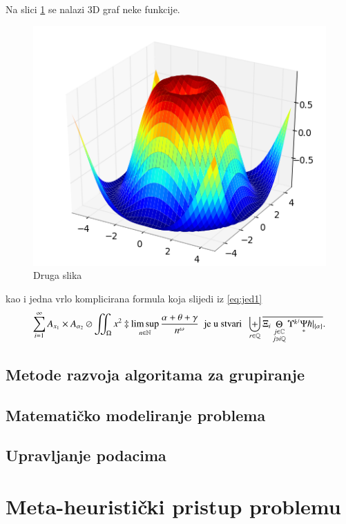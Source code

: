 \documentclass[a4paper,twoside,12pt]{memoir} %
\begin{document}
Na slici \ref{fig:3d} se nalazi 3D graf neke funkcije. 

\begin{figure}[h!t]
\centering \includegraphics{surface3d.png}
\caption{Druga slika}
\label{fig:3d}
\end{figure}

kao i jedna vrlo komplicirana formula koja slijedi iz \eqref{eq:jed1}
\[ \sum_{i=1}^{\infty}A_{x_1}\times A_{{\alpha}_2}\oslash\iint_{\Omega}x^2\ddagger\limsup_{n\in\mathbb{N}}\frac{\alpha+\theta+\gamma}{n^{\omega}}\;\;\text{je u stvari}\;\;\biguplus_{r\in\mathbb{Q}}\overline{\Xi_i \mathop\Theta_{\substack{j\in\mathbb{C} \\ j\ni i\mathbb{Q}}} \Upsilon^{k^j} \underset{\ast}{\Psi} \hslash\vert_{\{\alpha\}}}.\]

\section[Metode razvoja algoritama za grupiranje][metode-razvoja]{Metode razvoja algoritama za grupiranje}
\section[Matematičko modeliranje problema][MMP]{Matematičko modeliranje problema}
\section[Upravljanje podacima][upravljanje-podacima]{Upravljanje podacima}

\chapter{Meta-heuristički pristup problemu}
\end{document}
